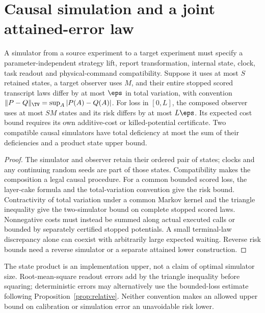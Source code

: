 \section{Causal simulation and a joint attained-error law}
\begin{proposition}\label{prop:simulation}
A simulator from a source experiment to a target experiment must specify a parameter-independent strategy lift, report transformation, internal state, clock, task readout and physical-command compatibility. Suppose it uses at most $S$ retained states, a target observer uses $M$, and their entire stopped scored transcript laws differ by at most $\eps$ in total variation, with convention $\|P-Q\|_{\TV}=\sup_A|P(A)-Q(A)|$. For loss in $[0,L]$, the composed observer uses at most $SM$ states and its risk differs by at most $L\eps$. Its expected cost bound requires its own additive-cost or killed-potential certificate. Two compatible causal simulators have total deficiency at most the sum of their deficiencies and a product state upper bound.
\end{proposition}
\begin{proof}
The simulator and observer retain their ordered pair of states; clocks and any continuing random seeds are part of those states. Compatibility makes the composition a legal causal procedure. For a common bounded scored loss, the layer-cake formula and the total-variation convention give the risk bound. Contractivity of total variation under a common Markov kernel and the triangle inequality give the two-simulator bound on complete stopped scored laws. Nonnegative costs must instead be summed along actual executed calls or bounded by separately certified stopped potentials. A small terminal-law discrepancy alone can coexist with arbitrarily large expected waiting. Reverse risk bounds need a reverse simulator or a separate attained lower construction.
\end{proof}

The state product is an implementation upper, not a claim of optimal simulator size. Root-mean-square readout errors add by the triangle inequality before squaring; deterministic errors may alternatively use the bounded-loss estimate following Proposition~\ref{prop:relative}. Neither convention makes an allowed upper bound on calibration or simulation error an unavoidable risk lower.


